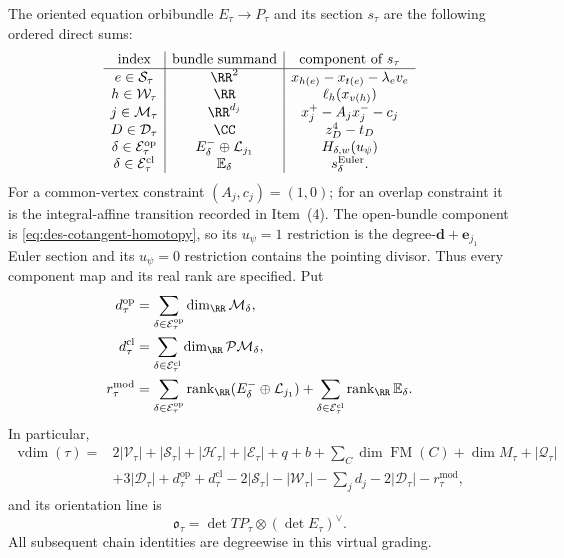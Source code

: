 \begin{definition}
The oriented equation orbibundle $E_\tau\to P_\tau$ and its section
$s_\tau$ are the following ordered direct sums:
\begin{equation}
\begin{array}{c|c|c}
\text{index}&\text{bundle summand}&\text{component of }s_\tau\\ \hline
e\in\mathcal S_\tau&\RR^2&x_{h(e)}-x_{t(e)}-\lambda_ev_e\\
h\in\mathcal W_\tau&\RR&\ell_h(x_{v(h)})\\
j\in\mathcal M_\tau&\RR^{d_j}&x_j^+-A_jx_j^--c_j\\
D\in\mathcal D_\tau&\CC&z_D^4-t_D\\
\delta\in\mathcal E_\tau^{\mathrm{op}}&
 E_\delta^-\oplus\mathcal L_{j_1}&H_{\delta,w}(u_\psi)\\
\delta\in\mathcal E_\tau^{\mathrm{cl}}&
 \mathbb E_\delta&s_\delta^{\mathrm{Euler}}.
\end{array}
 \label{eq:des-incidence-section}
\end{equation}
For a common-vertex constraint $(A_j,c_j)=(1,0)$; for an overlap constraint
it is the integral-affine transition recorded in Item~(4).  The open-bundle
component is
\eqref{eq:des-cotangent-homotopy}, so its $u_\psi=1$ restriction is the
degree-$\mathbf d+\mathbf e_{j_1}$ Euler section and its $u_\psi=0$
restriction contains the pointing divisor.  Thus every component map and
its real rank are specified.  Put
\begin{equation}
\begin{aligned}
 d_\tau^{\mathrm{op}}
 &=\sum_{\delta\in\mathcal E_\tau^{\mathrm{op}}}
   \dim_{\RR}\mathcal M_\delta,\\
 d_\tau^{\mathrm{cl}}
 &=\sum_{\delta\in\mathcal E_\tau^{\mathrm{cl}}}
   \dim_{\RR}\mathcal{PM}_\delta,\\
 r_\tau^{\mathrm{mod}}
 &=\sum_{\delta\in\mathcal E_\tau^{\mathrm{op}}}
   \operatorname{rank}_{\RR}(E_\delta^-\oplus\mathcal L_{j_1})
   +\sum_{\delta\in\mathcal E_\tau^{\mathrm{cl}}}
   \operatorname{rank}_{\RR}\mathbb E_\delta.
\end{aligned}
 \label{eq:des-moduli-dimensions}
\end{equation}
In particular,
\begin{equation}
\begin{aligned}
 \operatorname{vdim}(\tau)={}&
 2|\mathcal V_\tau|+|\mathcal S_\tau|+|\mathcal H_\tau|
 +|\mathcal E_\tau|+q+b+\sum_C\dim\operatorname{FM}(C)
 +\dim M_\tau+|\mathcal Q_\tau|\\
 &+3|\mathcal D_\tau|
 +d_\tau^{\mathrm{op}}+d_\tau^{\mathrm{cl}}
 -2|\mathcal S_\tau|-|\mathcal W_\tau|-\sum_jd_j
 -2|\mathcal D_\tau|
 -r_\tau^{\mathrm{mod}},
 \label{eq:des-virtual-dimension}
\end{aligned}
\end{equation}
and its orientation line is
\begin{equation}
 \mathfrak o_\tau=\det TP_\tau\otimes(\det E_\tau)^\vee.
 \label{eq:des-incidence-orientation}
\end{equation}
All subsequent chain identities are degreewise in this virtual grading.
\end{definition}

